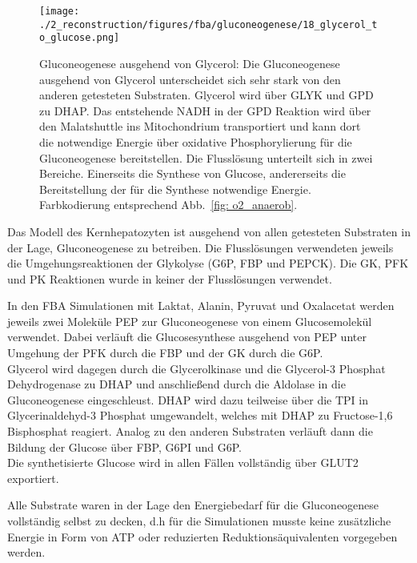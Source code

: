\begin{figure}[!htp]
 \centering
 \texttt{[image: ./2\_reconstruction/figures/fba/gluconeogenese/18\_glycerol\_to\_glucose.png]}%
 \caption{Gluconeogenese ausgehend von Glycerol: Die Gluconeogenese ausgehend von Glycerol unterscheidet sich sehr stark von den anderen getesteten Substraten. Glycerol wird über GLYK und GPD zu DHAP. Das entstehende NADH in der GPD Reaktion wird über den Malatshuttle ins Mitochondrium transportiert und kann dort die notwendige Energie über oxidative Phosphorylierung für die Gluconeogenese bereitstellen. Die Flusslösung unterteilt sich in zwei Bereiche. Einerseits die Synthese von Glucose, andererseits die Bereitstellung der für die Synthese notwendige Energie. Farbkodierung entsprechend Abb.~\ref{fig: o2_anaerob}.}
 \label{fig: 18_glycerol_to_glucose}
\end{figure}

Das Modell des Kernhepatozyten ist ausgehend von allen getesteten Substraten in der Lage, Gluconeogenese zu betreiben. Die Flusslösungen verwendeten jeweils die Umgehungsreaktionen der Glykolyse (G6P, FBP und PEPCK). Die GK, PFK und PK Reaktionen wurde in keiner der Flusslösungen verwendet.

In den FBA Simulationen mit Laktat, Alanin, Pyruvat und Oxalacetat werden jeweils zwei Moleküle PEP zur Gluconeogenese von einem Glucosemolekül verwendet. Dabei verläuft die Glucosesynthese ausgehend von PEP unter Umgehung der PFK durch die FBP und der GK durch die G6P.\\
Glycerol wird dagegen durch die Glycerolkinase und die Glycerol-3 Phosphat Dehydrogenase zu DHAP und anschließend durch die  Aldolase in die Gluconeogenese eingeschleust. DHAP wird dazu teilweise über die TPI in Glycerinaldehyd-3 Phosphat umgewandelt, welches mit DHAP zu Fructose-1,6 Bisphosphat reagiert. Analog zu den anderen Substraten verläuft dann die Bildung der Glucose über FBP, G6PI und G6P.\\
Die synthetisierte Glucose wird in allen Fällen vollständig über GLUT2 exportiert.

Alle Substrate waren in der Lage den Energiebedarf für die Gluconeogenese vollständig selbst zu decken, d.h für die Simulationen musste keine zusätzliche Energie in Form von ATP oder reduzierten Reduktionsäquivalenten vorgegeben werden.\\

